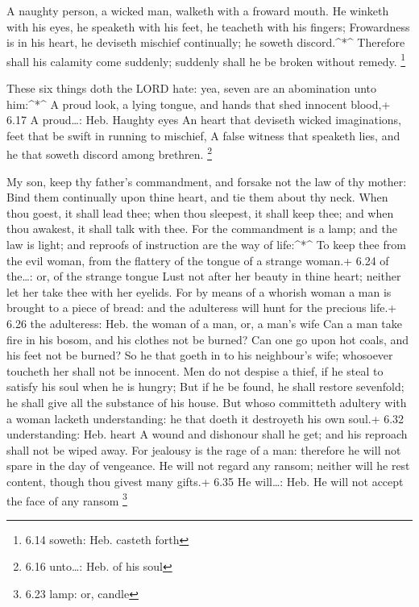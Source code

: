  A naughty person, a wicked man, walketh with a froward
mouth.  He winketh with his eyes, he speaketh with his
feet, he teacheth with his fingers;  Frowardness is in his
heart, he deviseth mischief continually; he soweth discord.\^{}*\^{}
 Therefore shall his calamity come suddenly; suddenly shall
he be broken without remedy. \footnote{6.14 soweth: Heb. casteth forth}

 These six things doth the LORD hate: yea, seven are an
abomination unto him:\^{}*\^{}  A proud look, a lying
tongue, and hands that shed innocent blood,+ 6.17 A proud\ldots: Heb.
Haughty eyes  An heart that deviseth wicked imaginations,
feet that be swift in running to mischief,  A false witness
that speaketh lies, and he that soweth discord among brethren.
\footnote{6.16 unto\ldots: Heb. of his soul}

 My son, keep thy father's commandment, and forsake not the
law of thy mother:  Bind them continually upon thine heart,
and tie them about thy neck.  When thou goest, it shall
lead thee; when thou sleepest, it shall keep thee; and when thou
awakest, it shall talk with thee.  For the commandment is a
lamp; and the law is light; and reproofs of instruction are the way of
life:\^{}*\^{}  To keep thee from the evil woman, from the
flattery of the tongue of a strange woman.+ 6.24 of the\ldots: or, of
the strange tongue  Lust not after her beauty in thine
heart; neither let her take thee with her eyelids.  For by
means of a whorish woman a man is brought to a piece of bread: and the
adulteress will hunt for the precious life.+ 6.26 the adulteress: Heb.
the woman of a man, or, a man's wife  Can a man take fire
in his bosom, and his clothes not be burned?  Can one go
upon hot coals, and his feet not be burned?  So he that
goeth in to his neighbour's wife; whosoever toucheth her shall not be
innocent.  Men do not despise a thief, if he steal to
satisfy his soul when he is hungry;  But if he be found, he
shall restore sevenfold; he shall give all the substance of his house.
 But whoso committeth adultery with a woman lacketh
understanding: he that doeth it destroyeth his own soul.+ 6.32
understanding: Heb. heart  A wound and dishonour shall he
get; and his reproach shall not be wiped away.  For
jealousy is the rage of a man: therefore he will not spare in the day of
vengeance.  He will not regard any ransom; neither will he
rest content, though thou givest many gifts.+ 6.35 He will\ldots: Heb.
He will not accept the face of any ransom \footnote{6.23 lamp: or,
  candle}

